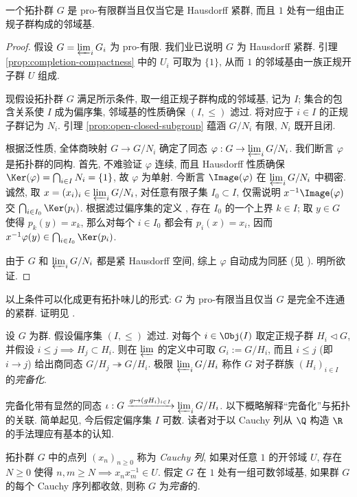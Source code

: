 \begin{theorem}\label{prop:profinite-characterization}
	一个拓扑群 $G$ 是 pro-有限群当且仅当它是 Hausdorff 紧群, 而且 $1$ 处有一组由正规子群构成的邻域基.
\end{theorem}
\begin{proof}
	假设 $G = \varprojlim_i G_i$ 为 pro-有限. 我们业已说明 $G$ 为 Hausdorff 紧群. 引理 \ref{prop:completion-compactness} 中的 $U_i$ 可取为 $\{1\}$, 从而 $1$ 的邻域基由一族正规开子群 $U$ 组成.

	现假设拓扑群 $G$ 满足所示条件, 取一组正规子群构成的邻域基, 记为 $I$; 集合的包含关系使 $I$ 成为偏序集, 邻域基的性质确保 $(I, \leq)$ 滤过. 将对应于 $i \in I$ 的正规子群记为 $N_i$. 引理 \ref{prop:open-closed-subgroup} 蕴涵 $G/N_i$ 有限, $N_i$ 既开且闭.

	根据泛性质, 全体商映射 $G \to G/N_i$ 确定了同态 $\varphi: G \to \varprojlim_i G/N_i$. 我们断言 $\varphi$ 是拓扑群的同构. 首先, 不难验证 $\varphi$ 连续, 而且 Hausdorff 性质确保 $\Ker(\varphi) = \bigcap_{i \in I} N_i = \{1\}$, 故 $\varphi$ 为单射. 今断言 $\Image(\varphi)$ 在 $\varprojlim_i G/N_i$ 中稠密. 诚然, 取 $x = (x_i)_i \in \varprojlim_i G/N_i$, 对任意有限子集 $I_0 \subset I$, 仅需说明 $x^{-1} \Image(\varphi)$ 交 $\bigcap_{i \in I_0} \Ker(p_i)$. 根据滤过偏序集的定义 , 存在 $I_0$ 的一个上界 $k \in I$; 取 $y \in G$ 使得 $p_k(y) = x_k$, 那么对每个 $i \in I_0$ 都会有 $p_i(x) = x_i$, 因而 $x^{-1} \varphi(y) \in \bigcap_{i \in I_0} \Ker(p_i)$.

	由于 $G$ 和 $\varprojlim_i G/N_i$ 都是紧 Hausdorff 空间, 综上 $\varphi$ 自动成为同胚 (见 \cite[\S 7.2]{Xiong}). 明所欲证.
\end{proof}
\begin{remark}\label{rem:totally-disconnected}
	以上条件可以化成更有拓扑味儿的形式: $G$ 为 pro-有限当且仅当 $G$ 是完全不连通的紧群. 证明见 \cite[命题 1.9.3]{FL14}.
\end{remark}

\begin{definition}[群的完备化]\label{def:group-completion} 
	设 $G$ 为群. 假设偏序集 $(I, \leq)$ 滤过. 对每个 $i \in \Obj(I)$ 取定正规子群 $H_i \lhd G$, 并假设 $i \leq j \implies H_j \subset H_i$. 则在 $\varprojlim$ 的定义中可取 $G_i := G/H_i$, 而且 $i \leq j$ (即 $i \to j$) 给出商同态 $G/H_j \twoheadrightarrow G/H_i$. 极限 $\varprojlim_i G/H_i$ 称作 $G$ 对子群族 $(H_i)_{i \in I}$ 的\emph{完备化}.
\end{definition}
完备化带有显然的同态 $\iota: G \xrightarrow{g \mapsto (gH_i)_{i \in I}} \varprojlim_i G/H_i$. 以下概略解释``完备化''与拓扑的关联. 简单起见, 今后假定偏序集 $I$ 可数. 读者对于以 Cauchy 列从 $\Q$ 构造 $\R$ 的手法理应有基本的认知.
\begin{definition}
	拓扑群 $G$ 中的点列 $(x_n)_{n \geq 0}$ 称为 \emph{Cauchy 列}, 如果对任意 $1$ 的开邻域 $U$, 存在 $N \geq 0$ 使得 $n, m \geq N \implies x_n x_m^{-1} \in U$. 假定 $G$ 在 $1$ 处有一组可数邻域基, 如果群 $G$ 的每个 Cauchy 序列都收敛, 则称 $G$ 为\emph{完备}的.
\end{definition}

